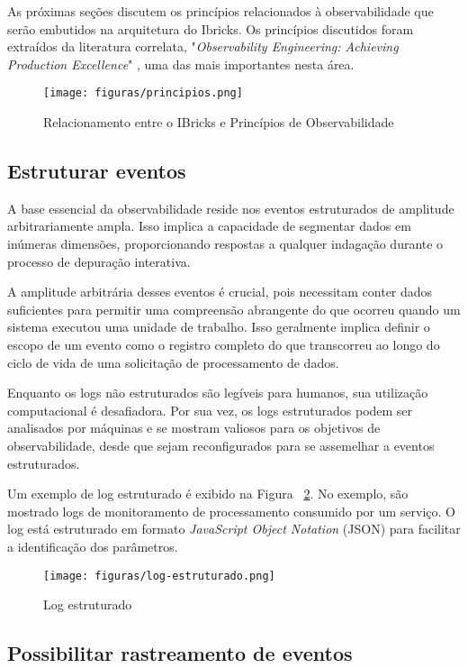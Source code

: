 \documentclass[12pt]{article}
\begin{document}
As próximas seções discutem os princípios relacionados à observabilidade que serão embutidos na arquitetura do Ibricks. Os princípios discutidos foram extraídos da literatura correlata, "\textit{Observability Engineering: Achieving Production Excellence}" \cite{majors2022observability}, uma das mais importantes nesta área.

\begin{figure}[!htb]
\centering
\texttt{[image: figuras/principios.png]}
\caption{Relacionamento entre o IBricks e Princípios de Observabilidade}
\label{fig:principios}
\end{figure}

\subsection{Estruturar eventos}

A base essencial da observabilidade reside nos eventos estruturados de amplitude arbitrariamente ampla. Isso implica a capacidade de segmentar dados em inúmeras dimensões, proporcionando respostas a qualquer indagação durante o processo de depuração interativa. 

A amplitude arbitrária desses eventos é crucial, pois necessitam conter dados suficientes para permitir uma compreensão abrangente do que ocorreu quando um sistema executou uma unidade de trabalho. Isso geralmente implica definir o escopo de um evento como o registro completo do que transcorreu ao longo do ciclo de vida de uma solicitação de processamento de dados.

Enquanto os logs não estruturados são legíveis para humanos, sua utilização computacional é desafiadora. Por sua vez, os logs estruturados podem ser analisados por máquinas e se mostram valiosos para os objetivos de observabilidade, desde que sejam reconfigurados para se assemelhar a eventos estruturados. 

Um exemplo de log estruturado é exibido na Figura ~\ref{fig:log}. No exemplo, são mostrado logs de monitoramento de processamento consumido por um serviço. O log está estruturado em formato \textit{JavaScript Object Notation} (JSON) para facilitar a identificação dos parâmetros.

\begin{figure}[!htb]
\centering
\texttt{[image: figuras/log-estruturado.png]}
\caption{Log estruturado}
\label{fig:log}
\end{figure}

\subsection{Possibilitar rastreamento de eventos} 
\end{document}
